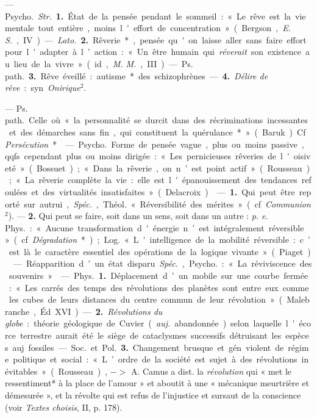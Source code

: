 \begin{itemize}[leftmargin=1cm, label=, itemsep=1pt]
 — \si{Psycho.} {\it Str.} {\bf 1.} État de la pensée pendant le
sommeil : « Le rêve est la vie mentale tout entière, moins l'effort de
concentration » (Bergson, {\it E. S.}, IV). — {\it Lato.} {\bf 2.} Rêverie*,
pensée qu'on laisse aller sans faire effort pour l'adapter à l’action : « Un
être humain qui {\it réverait} son existence au lieu de la vivre... » (id.,
{\it M. M.}, III).

— \si{Ps. path.} {\bf 3.} Rêve éveillé : autisme* des schizophrènes. —
{\bf 4.} {\it Délire de rêve} : syn. {\it Onirique}$^2$.

 — \si{Ps. path.} Celle où « la personnalité se
durcit dans des récriminations incessantes et des démarches sans fin, qui
constituent la quérulance* » (Baruk). Cf. {\it Persécution}*.

 — \si{Psycho.} Forme de pensée vague, plus ou moins passive,
qqfs. cependant plus ou moins dirigée : « Les pernicieuses rêveries de
l'oisiveté » (Bossuet) ; « Dans la rêverie, on n’est point actif
» (Rousseau) ; « La rêverie complète la vie : elle est l'épanouissement des
tendances refoulées et des virtualités insatisfaites » (Delacroix).

 — {\bf 1.} Qui peut être reporté sur autrui, {\it Spéc.},
\si{Théol.} « Réversibilité des mérites » (cf. {\it Communion}$^2$). —
{\bf 2.} Qui peut se faire, soit dans un sens, soit dans un autre :
{\it p. e.} \si{Phys.} : « Aucune transformation d'énergie n’est
intégralement réversible » (cf. {\it Dégradation}*) ; \si{Log.} «
L'intelligence de la mobilité réversible : c’est là le caractère essentiel
des opérations de la logique vivante » (Piaget).

 — Réapparition d’un état disparu. {\it Spéc.},
\si{Psycho.} : « La réviviscence des souvenirs. »

 — \si{Phys.} {\bf 1.} Déplacement d’un mobile sur une courbe
fermée : « Les carrés des temps des révolutions des planètes sont entre eux
comme les cubes de leurs distances du centre commun de leur révolution
» (Malebranche, Éd. XVI) — {\bf 2.} {\it Révolutions du globe} : théorie
géologique de Cuvier ({\it auj.} abandonnée) selon laquelle l'écorce
terrestre aurait été le siège de cataclysmes successifs détruisant les
espèces auj. fossiles.

— \si{Soc.} et \si{Pol.} {\bf 3.} Changement brusque et gén. violent de
régime politique et social : « L’ordre de la société est sujet à des
révolutions inévitables » (Rousseau), $->$ A. Camus a dist. la {\it
révolution} qui « met le ressentiment* à la place de l'amour » et aboutit à
une « mécanique meurtrière et démesurée », et la révolte qui est refus de
l'injustice et sursaut de la conscience (voir {\it Textes choisis}, II, p.
178).


\end{itemize}
